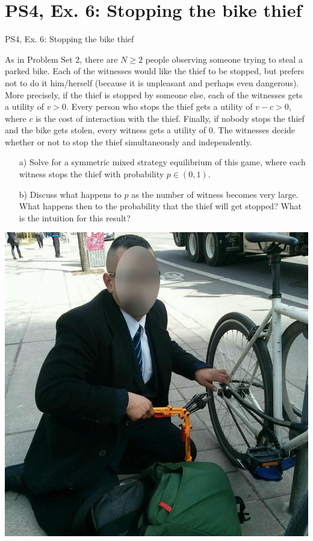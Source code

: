 \section{PS4, Ex. 6: Stopping the bike thief}

\begin{frame}{PS4, Ex. 6: Stopping the bike thief}
  \begin{multicols}{2}
    As in Problem Set 2, there are $N\geq2$ people observing someone trying to steal a parked bike. Each of the witnesses would like the thief to be stopped, but prefers not to do it him/herself (because it is unpleasant and perhaps even dangerous). More precisely, if the thief is stopped by someone else, each of the witnesses gets a utility of $v > 0$. Every person who stops the thief gets a utility of $v-c>0$, where $c$ is the cost of interaction with the thief. Finally, if nobody stops the thief and the bike gets stolen, every witness gets a utility of $0$. The witnesses decide whether or not to stop the thief simultaneously and independently.
  \vfill\null \columnbreak
    \begin{itemize}
      \item[a)] Solve for a symmetric mixed strategy equilibrium of this game, where each witness stops the thief with probability $p\in(0,1)$.
      \item[b)] Discuss what happens to $p$ as the number of witness becomes very large. What happens then to the probability that the thief will get stopped? What is the intuition for this result?
    \end{itemize}
    \includegraphics[width=\columnwidth]{figures/bike_thief}
  \vfill\null
  \end{multicols}
\end{frame}
